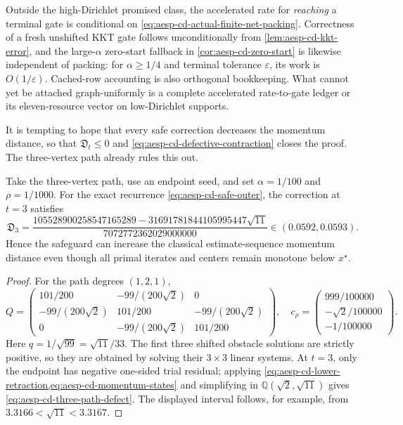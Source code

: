Outside the high-Dirichlet promised class, the accelerated rate for
\emph{reaching} a terminal gate is conditional on
\cref{eq:aesp-cd-actual-finite-net-packing}.  Correctness of a fresh
unshifted KKT gate follows unconditionally from
\cref{lem:aesp-cd-kkt-error}, and the large-$\alpha$ zero-start fallback in
\cref{cor:aesp-cd-zero-start} is likewise independent of packing: for
$\alpha\geq1/4$ and terminal tolerance $\varepsilon$, its work is
$O(1/\varepsilon)$.  Cached-row accounting is also orthogonal bookkeeping.
What cannot yet be attached graph-uniformly is a complete accelerated
rate-to-gate ledger or its eleven-resource vector on low-Dirichlet supports.

It is tempting to hope that every safe correction decreases the momentum
distance, so that $\mathfrak D_t\leq0$ and
\cref{eq:aesp-cd-defective-contraction} closes the proof.  The three-vertex
path already rules this out.

\begin{proposition}
\label{prop:aesp-cd-momentum-expansion}
Take the three-vertex path, use an endpoint seed, and set
$\alpha=1/100$ and $\rho=1/1000$.  For the exact recurrence
\cref{eq:aesp-cd-safe-outer}, the correction at $t=3$ satisfies
\begin{equation}
 \mathfrak D_3
 =\frac{
 105528900258547165289
 -31691781844105995447\sqrt{11}}
 {7072772362029000000}
 \in(0.0592,0.0593).
 \label{eq:aesp-cd-three-path-defect}
\end{equation}
Hence the safeguard can increase the classical estimate-sequence momentum
distance even though all primal iterates and centers remain monotone below
$x^\star$.
\end{proposition}

\begin{proof}
For the path degrees $(1,2,1)$,
\begin{equation*}
 Q=
 \begin{pmatrix}
 101/200&-99/(200\sqrt2)&0\\
 -99/(200\sqrt2)&101/200&-99/(200\sqrt2)\\
 0&-99/(200\sqrt2)&101/200
 \end{pmatrix},
 \quad
 c_\rho=
 \begin{pmatrix}999/100000\\-\sqrt2/100000\\-1/100000\end{pmatrix}.
\end{equation*}
Here $q=1/\sqrt{99}=\sqrt{11}/33$.  The first three shifted obstacle
solutions are strictly positive, so they are obtained by solving their
$3\times3$ linear systems.  At $t=3$, only the endpoint has negative
one-sided trial residual; applying
\cref{eq:aesp-cd-lower-retraction,eq:aesp-cd-momentum-states} and simplifying
in $\mathbb Q(\sqrt2,\sqrt{11})$ gives
\cref{eq:aesp-cd-three-path-defect}.  The displayed interval follows, for
example, from $3.3166<\sqrt{11}<3.3167$.
\end{proof}

